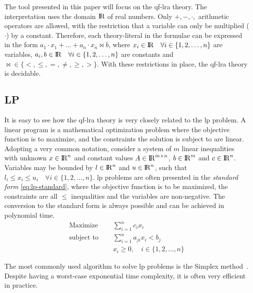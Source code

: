 \documentclass[runningheads]{llncs}
\begin{document}
The tool presented in this paper will focus on the \gls{qf-lra} theory.
The interpretation uses the domain ${\rm I\!R}$ of real numbers.
Only $+, -, \cdot,$ arithmetic operators are allowed, with the restriction that a variable can only be multiplied ($\cdot$) by a constant.
Therefore, each theory-literal in the formulae can be expressed in the form $a_1 \cdot x_1 + \ldots + a_n \cdot x_n \bowtie b$, where $x_i \in {\rm I\!R} \quad \forall i \in \{1, 2, \dots, n\}$ are variables, $a_i, b \in {\rm I\!R} \quad \forall i \in \{1, 2, \dots, n\}$ are constants and $\bowtie \in \{<, \le, =, \ne, \ge, >\}$.
With these restrictions in place, the \gls{qf-lra} theory is decidable.

\subsection{LP}
\label{sec:lp}

It is easy to see how the \gls{qf-lra} theory is very closely related to the \gls{lp} problem.
A linear program is a mathematical optimization problem where the objective function is to maximize, and the constraints the solution is subject to are linear.
Adopting a very common notation, consider a system of $m$ linear inequalities with unknown $x \in {\rm I\!R}^n$ and constant values $A \in {\rm I\!R}^{m \times n}$, $b \in {\rm I\!R}^m$ and $c \in {\rm I\!R}^n$.
Variables may be bounded by $l \in {\rm I\!R}^n$ and $u \in {\rm I\!R}^n$, such that $l_i \le x_i \le u_i \quad \forall i \in \{1, 2, \ldots, n\}$.
\gls{lp} problems are often presented in the \textit{standard form} \eqref{eq:lp-standard}, where the objective function is to be maximized, the constraints are all $\le$ inequalities and the variables are non-negative.
The conversion to the standard form is always possible and can be achieved in polynomial time.
\begin{equation}
    \label{eq:lp-standard}
    \begin{split}
        \text{Maximize }   \quad & \sum_{i=1}^{n} c_i x_i                      \\
        \text{subject to } \quad & \sum_{i=1}^{n} a_{ji}x_{i} < b_j            \\
        & x_i \ge 0,  \quad i \in \{1, 2, \ldots, n\}
    \end{split}
\end{equation}

The most commonly used algorithm to solve \gls{lp} problems is the Simplex method~\cite{ref:simplex}.
Despite having a worst-case exponential time complexity, it is often very efficient in practice.
\end{document}
